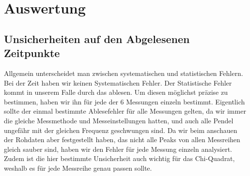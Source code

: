 \documentclass[twoside]{protokoll}
\begin{document}
\section{Auswertung}

\subsection{Unsicherheiten auf den Abgelesenen Zeitpunkte}
Allgemein unterscheidet man zwischen systematischen und statistischen Fehlern.
Bei der Zeit haben wir keinen Systematischen Fehler.
Der Statistische Fehler kommt in unserem Falle durch das ablesen.
Um diesen möglichst präzise zu bestimmen, haben wir ihn für jede der 6 Messungen einzeln bestimmt.
Eigentlich sollte der einmal bestimmte Ablesefehler für alle Messungen gelten, da wir immer die gleiche Messmethode und Messeinstellungen hatten, und auch alle Pendel ungefähr mit der gleichen Frequenz geschwungen sind.
Da wir beim anschauen der Rohdaten aber festgestellt haben, das nicht alle Peaks von allen Messreihen gleich sauber sind, haben wir den Fehler für jede Messung einzeln analysiert.
Zudem ist die hier bestimmte Unsicherheit auch wichtig für das Chi-Quadrat, weshalb es für jede Messreihe genau passen sollte.\\
 
\end{document}
